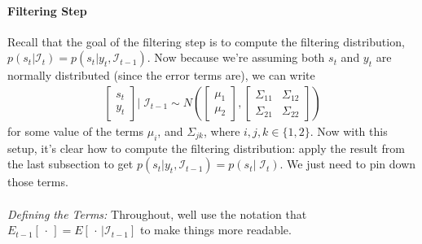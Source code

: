 \documentclass[a4paper,12pt]{article}
\begin{document}
\paragraph{Filtering Step}
Recall that the goal of the filtering step is to compute the
filtering distribution, $p(s_t|\mathcal{I}_{t})=p(s_t|y_t, \mathcal{I}_{t-1})$. Now because we're assuming both $s_t$ and $y_t$ are normally distributed (since the error terms are), we can write 
\begin{align*}
  \begin{bmatrix} s_t \\ y_t \end{bmatrix} | \; 
  \mathcal{I}_{t-1}
  \sim 
  N\left(\begin{bmatrix} \mu_1 \\ \mu_2 \end{bmatrix},
  \begin{bmatrix} \Sigma_{11} & \Sigma_{12} \\
  \Sigma_{21} & \Sigma_{22} \end{bmatrix} 
  \right)
\end{align*}
for some value of the terms $\mu_{i}$, and $\Sigma_{jk}$, where $i, j, k\in\{1,2\}$. Now with this setup, it's clear how to compute the filtering distribution: apply the result from the last subsection to get $p(s_t|y_t, \mathcal{I}_{t-1}) = p(s_t | \;\mathcal{I}_{t})$. We just need to pin down those terms.
\\
\\
{\sl Defining the Terms:} Throughout, well use the notation that
$E_{t-1}[\,\cdot\,] = E[\,\cdot\,|\mathcal{I}_{t-1}]$ to make things more
readable.
\end{document}
